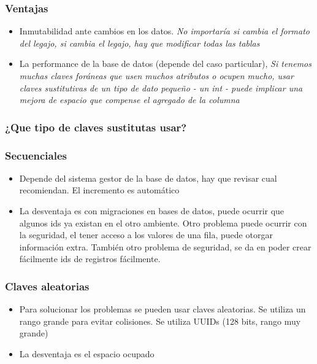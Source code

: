 \subsubsection*{Ventajas}

\begin{itemize}
\item Inmutabilidad ante cambios en los datos. \textit{No importaría si cambia el formato del legajo, si cambia el legajo, hay que modificar todas las tablas}
\item La performance de la base de datos (depende del caso particular), \textit{Si tenemos muchas claves foráneas que usen muchos atributos o ocupen mucho, usar claves sustitutivas de un tipo de dato pequeño - un int - puede implicar una mejora de espacio que compense el agregado de la columna}
\end{itemize}

\subsubsection*{¿Que tipo de claves sustitutas usar?}

\subsubsection*{Secuenciales}

\begin{itemize}
\item Depende del sistema gestor de la base de datos, hay que revisar cual recomiendan. El incremento es automático
\item La desventaja es con migraciones en bases de datos, puede ocurrir que algunos ids ya existan en el otro ambiente. Otro problema puede ocurrir con la seguridad, el tener acceso a los valores de una fila, puede otorgar información extra. También otro problema de seguridad, se da en poder crear fácilmente ids de registros fácilmente.
\end{itemize}

\subsubsection*{Claves aleatorias}

\begin{itemize}
\item Para solucionar los problemas se pueden usar claves aleatorias. Se utiliza un rango grande para evitar colisiones. Se utiliza UUIDs (128 bits, rango muy grande)
\item La desventaja es el espacio ocupado
\end{itemize}

